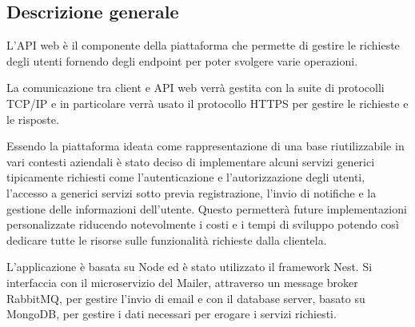 \subsection{Descrizione generale}
L'API web è il componente della piattaforma che permette di gestire le richieste degli utenti fornendo degli
endpoint per poter svolgere varie operazioni.

La comunicazione tra client e API web verrà gestita con la suite di protocolli TCP/IP e in particolare verrà usato il protocollo HTTPS per gestire
le richieste e le risposte.

Essendo la piattaforma ideata come rappresentazione di una base riutilizzabile in vari contesti aziendali è stato deciso di implementare alcuni servizi
generici tipicamente richiesti come l'autenticazione e l'autorizzazione degli utenti, l'accesso a generici servizi sotto previa registrazione, l'invio di notifiche e
la gestione delle informazioni dell'utente. Questo permetterà future implementazioni personalizzate riducendo notevolmente i costi e i tempi di sviluppo potendo così dedicare
tutte le risorse sulle funzionalità richieste dalla clientela.

L'applicazione è basata su Node ed è stato utilizzato il framework Nest.
Si interfaccia con il microservizio del Mailer, attraverso un message broker RabbitMQ, per gestire l'invio di email e con il database server, basato su MongoDB, per gestire i dati necessari
per erogare i servizi richiesti.
